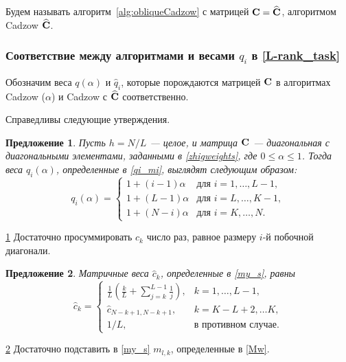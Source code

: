 \documentclass[12pt,a4paper,fleqn,leqno]{article}
\newtheorem{proposition}{Предложение}
\begin{document}
Будем называть алгоритм~\ref{alg:obliqueCadzow} с матрицей $\mathbf{C}=\widehat{\mathbf{C}}$, алгоритмом Cadzow $\widehat{\mathbf{C}}$.

\subsubsection{Соответствие между алгоритмами и весами $q_i$ в \eqref{L-rank_task}}

Обозначим веса $q(\alpha)$ и $\hat q_i$, которые порождаются матрицей $\mathbf{C}$ в алгоритмах Cadzow ($\alpha$) и Cadzow с $\widehat{\mathbf{C}}$ соответственно.

Справедливы следующие утверждения.

\begin{proposition}\label{zhigconseq}
Пусть $h = N/L$ --- целое, и матрица $\mathbf{C}$ --- диагональная с диагональными элементами,
заданными в \eqref{zhigweights},
где $0 \le \alpha \le 1$. Тогда веса $q_i(\alpha)$, определенные в \eqref{qi_mi}, выглядят следующим образом:
\begin{equation*}
q_i (\alpha) = \begin{cases}
1 + (i - 1) \alpha & \text{для $i = 1, \ldots, L-1,$}\\
1 + (L - 1) \alpha & \text{для $i = L, \ldots, K-1,$}\\
1 + (N - i) \alpha & \text{для $i = K, \ldots, N.$}
\end{cases}
\end{equation*}
\end{proposition}
\begin{proof5}{\ref{zhigconseq}}
Достаточно просуммировать $c_k$ число раз, равное размеру $i$-й побочной диагонали.
\end{proof5}


\begin{proposition} \label{myweightstat}
Матричные веса $\hat c_k$, определенные в \eqref{my_s}, равны
\begin{equation*}
\hat c_k = \begin{cases}
\frac{1}{L}\left(\frac{k}{L} + \sum_{j=k}^{L-1} \frac{1}{j} \right),& k = 1, \ldots, L-1, \\
\hat c_{N - k + 1, N - k + 1}, & k = K - L + 2, \ldots K, \\
1/L, &\text{в противном случае}.
\end{cases}
\end{equation*}
\end{proposition}

\begin{proof5}{\ref{myweightstat}}
Достаточно подставить в \eqref{my_s} $m_{l,k}$, определенные в \eqref{Mw}.
\end{proof5}
\end{document}
